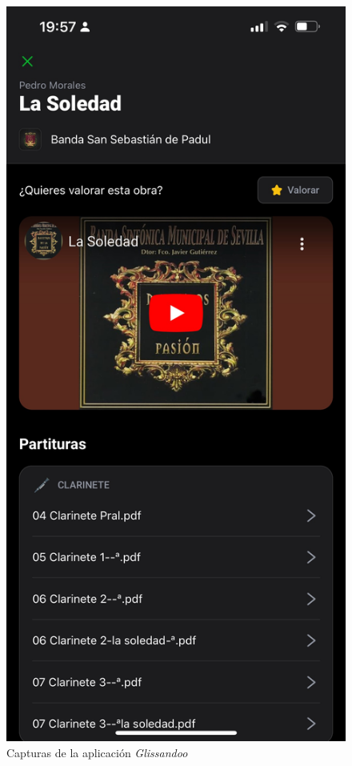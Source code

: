 \begin{figure}[h]
\endminipage\hfill
{}
  \includegraphics[width=\linewidth]{imagenes/capturas_glissandoo/IMG_0930.jpeg}
\endminipage
\caption{Capturas de la aplicación \textit{Glissandoo}}\label{fig:capturas_glissandoo}
\centering
\end{figure}


